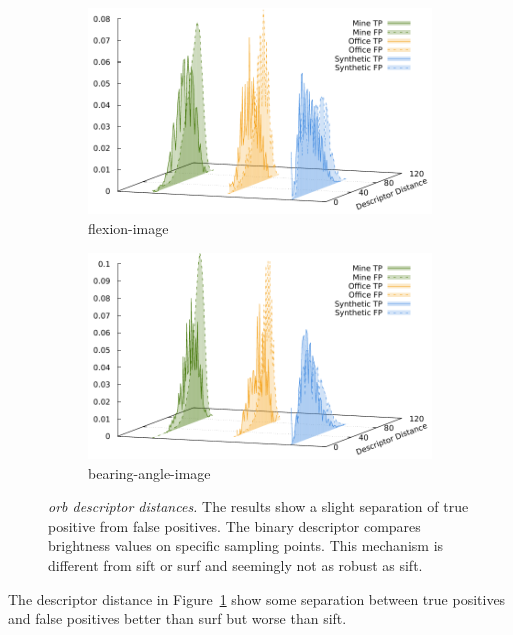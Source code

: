\begin{figure}[htp]
\begin{subfigure}[t]{0.45\linewidth}
    \includegraphics[width=\linewidth]{chapter06/results/ORB/flexion/descriptor_distances.pdf}%
    \caption{\gls{flexion-image}}
\end{subfigure}\quad
\begin{subfigure}[t]{0.45\linewidth}
    \includegraphics[width=\linewidth]{chapter06/results/ORB/bearing/descriptor_distances.pdf}%
    \caption{\gls{bearing-angle-image}}
\end{subfigure}
\caption[\acrshort{orb} descriptor distances]{\emph{\acrshort{orb} descriptor distances.} The results show a slight separation of true positive from false positives. The binary descriptor compares brightness values on specific sampling points. This mechanism is different from \acrshort{sift} or \acrshort{surf} and seemingly not as robust as \acrshort{sift}.}\label{fig:orb_descriptor_distances}
\end{figure}
The descriptor distance in Figure~\ref{fig:orb_descriptor_distances} show some separation between true positives and false positives better than \acrshort{surf} but worse than \acrshort{sift}.
